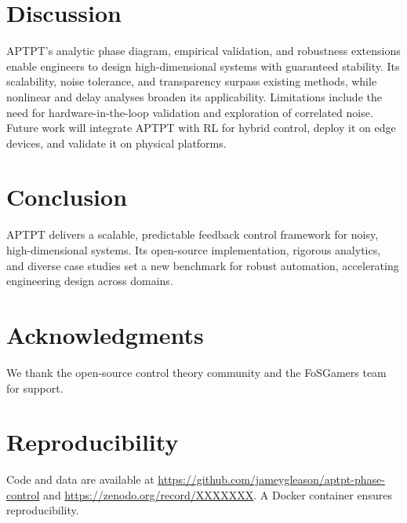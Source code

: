 \documentclass[12pt]{article}
\begin{document}
\section{Discussion}
APTPT’s analytic phase diagram, empirical validation, and robustness extensions enable engineers to design high-dimensional systems with guaranteed stability. Its scalability, noise tolerance, and transparency surpass existing methods, while nonlinear and delay analyses broaden its applicability. Limitations include the need for hardware-in-the-loop validation and exploration of correlated noise. Future work will integrate APTPT with RL for hybrid control, deploy it on edge devices, and validate it on physical platforms.

\section{Conclusion}
APTPT delivers a scalable, predictable feedback control framework for noisy, high-dimensional systems. Its open-source implementation, rigorous analytics, and diverse case studies set a new benchmark for robust automation, accelerating engineering design across domains.

\section*{Acknowledgments}
We thank the open-source control theory community and the FoSGamers team for support.

\section*{Reproducibility}
Code and data are available at \url{https://github.com/jameygleason/aptpt-phase-control} and \url{https://zenodo.org/record/XXXXXXX}. A Docker container ensures reproducibility.




\appendix
\end{document}
